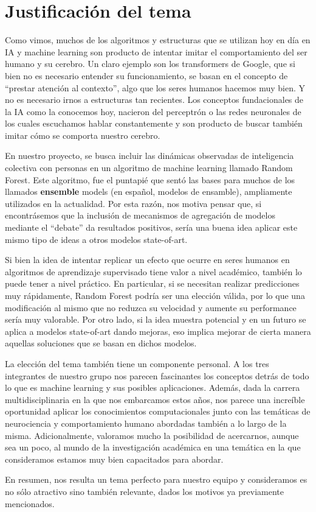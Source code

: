 %
\chapter{Justificación del tema}
\label{ch::capitulo2}

Como vimos, muchos de los algoritmos y estructuras que se utilizan hoy en día en IA y machine learning son producto de intentar imitar el comportamiento del ser humano y su cerebro. Un claro ejemplo son los transformers de Google, que si bien no es necesario entender su funcionamiento, se basan en el concepto de “prestar atención al contexto”, algo que los seres humanos hacemos muy bien. Y no es necesario irnos a estructuras tan recientes. Los conceptos fundacionales de la IA como la conocemos hoy, nacieron del perceptrón o las redes neuronales de los cuales escuchamos hablar constantemente y son producto de buscar también imitar cómo se comporta nuestro cerebro.

En nuestro proyecto, se busca incluir las dinámicas observadas de inteligencia colectiva con personas en un algoritmo de machine learning llamado Random Forest. Este algoritmo, fue el puntapié que sentó las bases para muchos de los llamados \textbf{ensemble} models (en español, modelos de ensamble), ampliamente utilizados en la actualidad. Por esta razón, nos motiva pensar que, si encontrásemos que la inclusión de mecanismos de agregación de modelos mediante el “debate” da resultados positivos, sería una buena idea aplicar este mismo tipo de ideas a otros modelos state-of-art.

Si bien la idea de intentar replicar un efecto que ocurre en seres humanos en algoritmos de aprendizaje supervisado tiene valor a nivel académico, también lo puede tener a nivel práctico. En particular, si se necesitan realizar predicciones muy rápidamente, Random Forest podría ser una elección válida, por lo que una modificación al mismo que no reduzca su velocidad y aumente su performance sería muy valorable. Por otro lado, si la idea muestra potencial y en un futuro se aplica a modelos state-of-art dando mejoras, eso implica mejorar de cierta manera aquellas soluciones que se basan en dichos modelos.

La elección del tema también tiene un componente personal. A los tres integrantes de nuestro grupo nos parecen fascinantes los conceptos detrás de todo lo que es machine learning y sus posibles aplicaciones. Además, dada la carrera multidisciplinaria en la que nos embarcamos estos años, nos parece una increíble oportunidad aplicar los conocimientos computacionales junto con las temáticas de neurociencia y comportamiento humano abordadas también a lo largo de la misma. Adicionalmente, valoramos mucho la posibilidad de acercarnos, aunque sea un poco, al mundo de la investigación académica en una temática en la que consideramos estamos muy bien capacitados para abordar. 

En resumen, nos resulta un tema perfecto para nuestro equipo y consideramos es no sólo atractivo sino también relevante, dados los motivos ya previamente mencionados.
